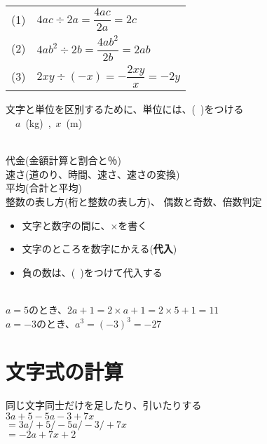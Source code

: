 \documentclass[11pt]{article}
\begin{document}

\begin{tabular}{ll}
(1) & $4ac \div 2a = \dfrac{4ac}{2a} =2c$\\
(2) & $4ab^2 \div 2 b = \dfrac{4ab^2}{2b} = 2ab$\\
(3) & $2xy \div (-x) = - \dfrac{2xy}{x} = -2y$\\
\end{tabular}


\begin{tcolorbox}[mybox={文字式と単位、数量の表し方}]
文字と単位を区別するために、単位には、(\ )をつける\\

  \ \ $a$\ (kg)\ ,\ $x$\ (m)
\end{tcolorbox}

\\
代金(金額計算と割合と％)\\
速さ(道のり、時間、速さ、速さの変換)\\
平均(合計と平均)\\
整数の表し方(桁と整数の表し方)、
偶数と奇数、倍数判定\\

\begin{tcolorbox}[mybox={文字への代入、式の値}]
\begin{itemize}
\item 文字と数字の間に、$\times$を書く
\item 文字のところを数字にかえる(\textbf{代入})
\item 負の数は、(\ )をつけて代入する
\end{itemize}
\end{tcolorbox}

\\
$a=5$のとき、$2a+1 = 2 \times a +1 = 2 \times 5 +1 =11$\\
$a=-3$のとき、$a^3 = (-3)^3 = -27$\\

\section{文字式の計算}
\begin{tcolorbox}[mybox={文字式の加減}]
同じ文字同士だけを足したり、引いたりする\\
$3a + 5 -5a -3 +7x$\\
$= 3a /+ 5 /-5a /-3 /+7x $\\
$= -2a +7x +2$
\end{tcolorbox}
\end{document}
